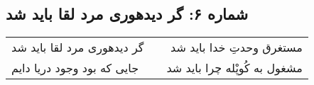 \begin{center}
\section*{شماره ۶: گر دیدهوری مرد لقا باید شد}
\label{sec:006}
\begin{longtable}{l p{0.5cm} r}
گر دیدهوری مرد لقا باید شد
&&
مستغرق وحدتِ خدا باید شد
\\
جایی که بود وجود دریا دایم
&&
مشغول به کُوپْله چرا باید شد
\\
\end{longtable}
\end{center}
